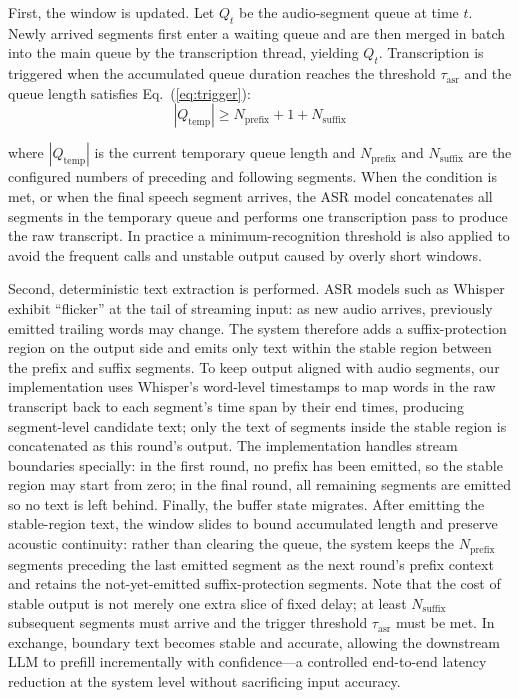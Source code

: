 \documentclass[pdflatex,iicol,Numbered,sn-basic]{sn-jnl}%
\begin{document}
First, the window is updated. Let $Q_t$ be the audio-segment queue at time $t$. Newly arrived segments first enter a waiting queue and are then merged in batch into the main queue by the transcription thread, yielding $Q_t$. Transcription is triggered when the accumulated queue duration reaches the threshold $\tau_{\mathrm{asr}}$ and the queue length satisfies Eq.~(\ref{eq:trigger}):
\begin{equation}
\left|Q_{\mathrm{temp}}\right|\geq N_{\mathrm{prefix}}+1+N_{\mathrm{suffix}}
\label{eq:trigger}
\end{equation}

where $\left|Q_{\mathrm{temp}}\right|$ is the current temporary queue length and $N_{\mathrm{prefix}}$ and $N_{\mathrm{suffix}}$ are the configured numbers of preceding and following segments. When the condition is met, or when the final speech segment arrives, the ASR model concatenates all segments in the temporary queue and performs one transcription pass to produce the raw transcript. In practice a minimum-recognition threshold is also applied to avoid the frequent calls and unstable output caused by overly short windows.

Second, deterministic text extraction is performed. ASR models such as Whisper exhibit ``flicker'' at the tail of streaming input: as new audio arrives, previously emitted trailing words may change. The system therefore adds a suffix-protection region on the output side and emits only text within the stable region between the prefix and suffix segments. To keep output aligned with audio segments, our implementation uses Whisper's word-level timestamps to map words in the raw transcript back to each segment's time span by their end times, producing segment-level candidate text; only the text of segments inside the stable region is concatenated as this round's output. The implementation handles stream boundaries specially: in the first round, no prefix has been emitted, so the stable region may start from zero; in the final round, all remaining segments are emitted so no text is left behind. Finally, the buffer state migrates. After emitting the stable-region text, the window slides to bound accumulated length and preserve acoustic continuity: rather than clearing the queue, the system keeps the $N_{\mathrm{prefix}}$ segments preceding the last emitted segment as the next round's prefix context and retains the not-yet-emitted suffix-protection segments. Note that the cost of stable output is not merely one extra slice of fixed delay; at least $N_{\mathrm{suffix}}$ subsequent segments must arrive and the trigger threshold $\tau_{\mathrm{asr}}$ must be met. In exchange, boundary text becomes stable and accurate, allowing the downstream LLM to prefill incrementally with confidence---a controlled end-to-end latency reduction at the system level without sacrificing input accuracy.
\end{document}

